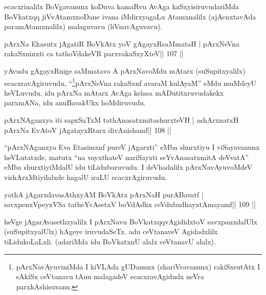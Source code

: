 \begin{artha}
ecacxrinalilx BoVgavanunx koDuva kamaRvu AvAga kaSxyisiruvudariMda  BoVkatxqq jiVvAtamxnoDane ivana iMdirxyagaLu Atamxnalilx (ajAcnxtavAda paramAtamxnalilx) malaguvavu (liVnavAguvavu).
\end{artha}

\begin{shl}
pArxNa Ekasutx jAgatiR BoVkAtx yoV gAgayxRsaMmataH |
pArxNeVna rakaSxninxti ca tathoVdakeVR parxvakaSxyXteV\hfill || 107 ||
\end{shl}

\begin{artha}
yAvudu gAgayxRnige saMmatavo A pArxNavoMdu mAtarx (suSupitxyalilx)  ecacxravAgiruvudu, ``\footnote[12]{pArxNavAyuviniMda I kiVLAda gUDanunx  (shariVravanunx) rakiSxsutAtx I sAkiSx ceVtanavu tAnu malagadeV ecacxravAgidudx neVra parxkAshisuvanu.}pArxNeVna rakaSxnf avaraM kulAyaM'' eMdu muMdeyU heVLuvudu. idu pArxNa mAtarx AvAga kelasa mADutitxruvudakekx parxmANa, idu anuBavakUkx hoMdiruvudu.
\end{artha}


\begin{shl}
pArxNAganxya iti sapxSaTxM tathA\s nasatxmitashurxteVH |
ashArxnatxH pArxNa EvAtoV jAgatayxRtarx divAnishamf\hfill || 108 ||
\end{shl}

\begin{artha}
``pArxNAganxya Eva Etasimxnf pureV jAgarxti'' eMba shurxtiyu I 
viSayavanunx heVLutatxde, matutx ``na vayxthateV nariSayxti seYvAnasatxmitA deVvatA'' eMba shurxtiyiMdalU idu tiLidubaruvudu. I deVhadalilx pArxNavAyuvoMdeV vishArxMtiyilalxde hagalU iraLU ecacxrAgiruvudu.
\end{artha} 

\begin{shl}
yathA jAgarxdavasAthxyAM BoVkAtx pArxNaH purA\s Bavatf |
savxpenxV\s peyxVSa tatheYvA\s\s setxV boVdAdhx ceVdubxdhayxtAmayamf\hfill || 109 ||
\end{shl}

\begin{artha}
heVge jAgarAvasethxyalilx I pArxNavu BoVkatxqqvAgididxtoV  savxpanxdalUlx (suSupitxyalUlx) hAgeye iruvudaSeTx. adu ceVtanaveV  Agidadxlilx tiLidukoLaLxli. (adariMda idu BoVkatxnU alalx ceVtanavU alalx).
\end{artha}


